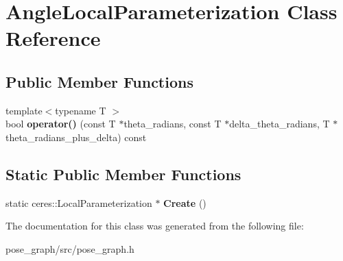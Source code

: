 \hypertarget{classAngleLocalParameterization}{}\section{Angle\+Local\+Parameterization Class Reference}
\label{classAngleLocalParameterization}
\subsection*{Public Member Functions}
\begin{DoxyCompactItemize}
\item 
\mbox{\label{classAngleLocalParameterization_ac2debe098dab8a96bbee0c6057997a86}} 
{\footnotesize template$<$typename T $>$ }\\bool {\bfseries operator()} (const T $\ast$theta\+\_\+radians, const T $\ast$delta\+\_\+theta\+\_\+radians, T $\ast$theta\+\_\+radians\+\_\+plus\+\_\+delta) const
\end{DoxyCompactItemize}
\subsection*{Static Public Member Functions}
\begin{DoxyCompactItemize}
\item 
\mbox{\label{classAngleLocalParameterization_a73006f5f3280d4adccfa3612f8188868}} 
static ceres\+::\+Local\+Parameterization $\ast$ {\bfseries Create} ()
\end{DoxyCompactItemize}


The documentation for this class was generated from the following file\+:\begin{DoxyCompactItemize}
\item 
pose\+\_\+graph/src/pose\+\_\+graph.\+h\end{DoxyCompactItemize}
